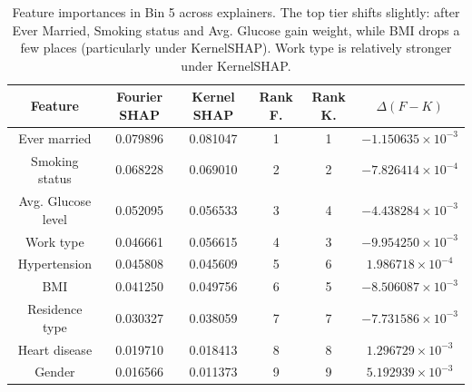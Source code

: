 \documentclass[letterpaper,11pt]{article}
\numberwithin{equation}{section}
\numberwithin{equation}{section}
\begin{document}
\begin{table}[H]
    \centering
    \begin{tabular}{|c||c|c|c|c|c|} \hline 
         Feature & Fourier SHAP & Kernel SHAP & Rank F. & Rank K. & $\Delta (F-K) $ \\ \hline \hline          
        Ever married & 0.079896 & 0.081047 & 1 & 1 &$-1.150635\times 10^{-3}$\\ \hline 
        Smoking status & 0.068228 &	0.069010 & 2 & 2 & $-7.826414 \times 10^{-4}$ \\ \hline 
        Avg. Glucose level & 0.052095 &	0.056533 & 3 & 4 & $-4.438284\times 10^{-3}$ \\ \hline 
        Work type &	0.046661 & 0.056615 & 4 & 3 &	$-9.954250\times 10^{-3}$ \\ \hline 
        Hypertension & 0.045808 & 0.045609 & 5 & 6 & $	1.986718\times 10^{-4}$\\ \hline 
        BMI & 0.041250 & 0.049756 &	6 &	5 & $-8.506087\times 10^{-3}$ \\ \hline 
        Residence type & 0.030327 &	0.038059 & 7 & 7 &	$-7.731586\times 10^{-3}$ \\ \hline 
        Heart disease &	0.019710 &	0.018413 &	8 &	8 &	$1.296729 \times 10^{-3}$\\ \hline 
        Gender & 0.016566 &	0.011373 & 9 & 9 &	$5.192939\times 10^{-3}$ \\ \hline 
    \end{tabular}
    \caption{Feature importances in Bin 5 across explainers. The top tier shifts slightly: after Ever Married, Smoking status and Avg. Glucose gain weight, while BMI drops a few places (particularly under KernelSHAP). Work type is relatively stronger under KernelSHAP.}
\end{table}
\end{document}
